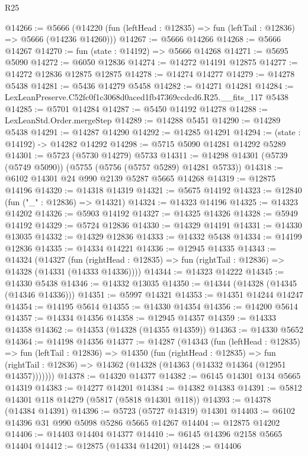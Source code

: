 \begin{lexlean}{R25}
\begin{coremodule}
@14266 := @5666
    (@14220 (fun (leftHead : @12835) => fun (leftTail : @12836) => @5666 (@14236 @14260)))
@14267 := @5666 @14266
@14268 := @5666 @14267
@14270 := fun (state : @14192) => @5666 @14268
@14271 := @5695 @5090
@14272 := @6050 @12836
@14274 := @14272 @14191 @12875
@14277 := @14272 @12836 @12875 @12875
@14278 := @14274 @14277
@14279 := @14278 @5438
@14281 := @5436 @14279 @5458
@14282 := @14271 @14281
@14284 := LexLeanPreserve.C52fc0f1c3068d0aced1fb47369ccdcd6.R25.__fits_117 @5438
@14285 := @5701 @14284
@14287 := @5450 @14192 @14278
@14288 := LexLeanStd.Order.mergeStep
@14289 := @14288 @5451
@14290 := @14289 @5438
@14291 := @14287 @14290
@14292 := @14285 @14291
@14294 := (state : @14192) -> @14282 @14292
@14298 := @5715 @5090 @14281 @14292 @5289
@14301 := @5723 (@5730 @14279) @5733
@14311 := @14298 @14301 (@5739 (@5749 @5090)) (@5755 (@5756 (@5757 @5289) @14281 @5733))
@14318 := @6102 @14301 @24 @990 @2139 @5287 @5665 @14268
@14319 := @12875 @14196
@14320 := @14318 @14319
@14321 := @5675 @14192
@14323 := @12840 (fun ("_" : @12836) => @14321)
@14324 := @14323 @14196
@14325 := @14323 @14202
@14326 := @5903 @14192
@14327 := @14325 @14326
@14328 := @5949 @14192
@14329 := @5724 @12836
@14330 := @14329 @14191
@14331 := @14330 @13035
@14332 := @14329 @12836
@14333 := @14332 @5438
@14334 := @14199 @12836
@14335 := @14334 @14221
@14336 := @12945 @14335
@14343 := @14324
    (@14327
      (fun (rightHead : @12835) => fun (rightTail : @12836) => @14328 (@14331 (@14333 @14336))))
@14344 := @14323 @14222
@14345 := @14330 @5438
@14346 := @14332 @13035
@14350 := @14344 (@14328 (@14345 (@14346 @14336)))
@14351 := @5997 @14321
@14353 := @14351 @14244 @14247
@14354 := @14195 @5614
@14355 := @14330 @14354
@14356 := @14200 @5614
@14357 := @14334 @14356
@14358 := @12945 @14357
@14359 := @14333 @14358
@14362 := @14353 (@14328 (@14355 @14359))
@14363 := @14330 @5652
@14364 := @14198 @14356
@14377 := @14287
    (@14343
      (fun (leftHead : @12835) =>
      fun (leftTail : @12836) =>
      @14350
        (fun (rightHead : @12835) =>
        fun (rightTail : @12836) => @14362 (@14328 (@14363 (@14332 @14364 (@12951 @14357)))))))
@14378 := @14320 @14377
@14382 := @6145 @14301 @134 @5665 @14319
@14383 := @14277 @14201
@14384 := @14382 @14383
@14391 := @5812 @14301 @118 @14279 (@5817 (@5818 @14301 @118))
@14393 := @14378 (@14384 @14391)
@14396 := @5723 (@5727 @14319) @14301
@14403 := @6102 @14396 @31 @990 @5098 @5286 @5665 @14267
@14404 := @12875 @14202
@14406 := @14403 @14404 @14377
@14410 := @6145 @14396 @2158 @5665 @14404
@14412 := @12875 (@14334 @14201)
@14428 := @14406

\end{coremodule}
\end{lexlean}
